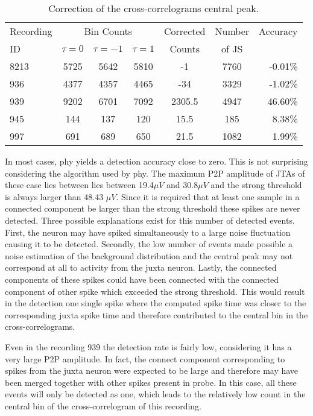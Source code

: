 \begin{table}[!h]
\begin{center}
\begin{tabular}{p{1.5cm}cccccr} %

\multicolumn{ 1}{p{1.5cm}}{Recording } & \multicolumn{ 3}{c}{Bin Counts} &  \multicolumn{ 1}{p{1.3cm}}{Corrected} & \multicolumn{ 1}{c}{Number} & \multicolumn{ 1}{c}{Accuracy} \\ 
\multicolumn{ 1}{l}{ID} & $\tau=0$ & $\tau=-1$ & $\tau=1$ & \multicolumn{ 1}{c}{Counts} & \multicolumn{ 1}{p{1.3cm}}{of JS} & \multicolumn{ 1}{l}{} \\ \hline
8213 & 5725 & 5642 & 5810 & -1 & 7760 & -0.01\% \\
936 & 4377 & 4357 & 4465 & -34 & 3329 & -1.02\% \\
939 & 9202 & 6701 & 7092 & 2305.5 & 4947 & 46.60\% \\
945 & 144 & 137 & 120 & 15.5 & 185 & 8.38\% \\ 
997 & 691 & 689 & 650 & 21.5 & 1082 & 1.99\% \\ 
\end{tabular}
\end{center}
\caption{Correction of the cross-correlograms central peak.}
\label{tab:CCcorrection}
\end{table}


In most cases, phy yields a detection accuracy close to zero. This is not surprising considering the algorithm used by phy. The maximum P2P amplitude of JTAs of these case lies between lies between 19.4$\mu V$ and 30.8$\mu V$ and the strong threshold is always larger than 48.43 $\mu V$. Since it is required that at least one sample in a connected component be larger than the strong threshold these spikes are never detected. Three possible explanations exist for this number of detected events. First, the neuron may have spiked simultaneously to a large noise fluctuation causing it to be detected. Secondly, the low number of events made possible a noise estimation of the background distribution and the central peak may not correspond at all to activity from the juxta neuron. Lastly, the connected components of these spikes could have been connected with the connected component of other spike which exceeded the strong threshold. This would result in the detection one single spike where the computed spike time was closer to the corresponding juxta spike time and therefore contributed to the central bin in the cross-correlograms.

Even in the recording 939 the detection rate is fairly low, considering it has a very large P2P amplitude. In fact, the connect component corresponding to spikes from the juxta neuron were expected to be large and therefore may have been merged together with other spikes present in probe. In this case, all these events will only be detected as one, which leads to the relatively low count in the central bin of the cross-correlogram of this recording.

